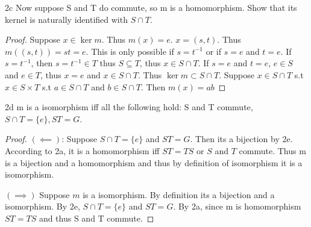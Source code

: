 \documentclass{article}
\begin{document}
\begin{claim}{2c}
    Now suppose S and T do commute, so m is a homomorphism. Show that its kernel is naturally identified with $S \cap T$. 
\end{claim}
\begin{proof}
    Suppose $x \in \ker m$. Thus $m(x) = e$. $x = (s, t)$. Thus $m((s, t)) = st = e$. This is only possible if $s = t^{-1}$ or if $s = e$ and $t = e$. If $s = t^{-1}$, then $s = t^{-1} \in T$ thus $S \subseteq T$, thus $x \in S \cap T$. If $s = e$ and $t = e$, $e \in S$ and $e \in T$, thus $x = e$ and $x \in S \cap T$. Thus $\ker m \subset S \cap T$. Suppose $x \in S \cap T$ s.t $x \in S \times T$ s.t $a \in S \cap T$ and $b \in S \cap T$. Then $m(x) = ab$
\end{proof}


\begin{claim}{2d}
    m is a isomorphism iff all the following hold: S and T commute, $S \cap T = \{e\}, ST = G$. 
\end{claim}
\begin{proof}
    $(\impliedby)$: Suppose $S \cap T = \{e\}$ and $ST = G$. Then its a bijection by 2e. According to 2a, it is a homomorphism iff $ST = TS$ or $S$ and $T$ commute. Thus m is a bijection and a homomorphism and thus by definition of isomorphism it is a isomorphism.

    $(\implies)$ Suppose $m$ is a isomorphism. By definition its a bijection and a isomorphism. By 2e, $S \cap T = \{e\}$ and $ST = G$. By 2a, since m is homomorphism $ST = TS$ and thus S and T commute.
\end{proof}
\end{document}
